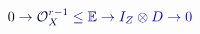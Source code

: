 \documentclass[12pt]{article}
\begin{document}
\makeatletter
\renewcommand*{\@textcolor}[3]{%
  \protect\leavevmode
  \begingroup
    \color#1{#2}#3%
  \endgroup
}
\makeatother
\begin{displaymath}
\mathcolor[RGB]{0,0,15}{0} \mathcolor[RGB]{0,0,30}{\to} \mathcal { \mathcolor[RGB]{0,0,45}{O} } _ { \mathcolor[RGB]{0,0,60}{X} } ^ { \mathcolor[RGB]{0,0,75}{r} \mathcolor[RGB]{0,0,90}{-} \mathcolor[RGB]{0,0,105}{1} } \mathcolor[RGB]{0,0,120}{\leq} \mathbb { \mathcolor[RGB]{0,0,135}{E} } \mathcolor[RGB]{0,0,150}{\to} \mathcolor[RGB]{0,0,165}{I} _ { \mathcolor[RGB]{0,0,180}{Z} } \mathcolor[RGB]{0,0,195}{\otimes} \mathcolor[RGB]{0,0,210}{D} \mathcolor[RGB]{0,0,225}{\to} \mathcolor[RGB]{0,0,240}{0}
\end{displaymath}
\end{document}

